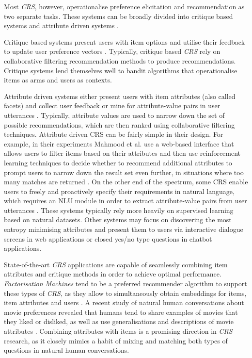 Most \textit{CRS}, however, operationalise preference elicitation and recommendation as two separate tasks. These systems can be broadly divided into critique based systems and attribute driven systems \citep{jannach2021survey, pramod2022conversational}. 

Critique based systems present users with item options and utilise their feedback to update user preference vectors \citep{viappiani2009regret, christakopoulou2016towards, vendrov2020gradient}. Typically, critique based \textit{CRS} rely on collaborative filtering recommendation methods to produce recommendations. Critique systems lend themselves well to bandit algorithms that operationalise items as arms and users as contexts.

Attribute driven systems either present users with item attributes (also called facets) and collect user feedback or mine for attribute-value pairs in user utterances \citep{mahmood2009improving, sun2018conversational, tsumita2019dialogue, kang2019recommendation}. Typically, attribute values are used to narrow down the set of possible recommendations, which are then ranked using collaborative filtering techniques. Attribute driven CRS can be fairly simple in their design. For example, in their experiments Mahmood et al. use a web-based interface that allows users to filter items based on their attributes and then use reinforcement learning techniques to decide whether to recommend additional attributes to prompt users to narrow down the result set even further, in situations where too many matches are returned \citep{mahmood2009improving, mahmood2008adaptive, mahmood2007learning, mahmood2008adapting}. On the other end of the spectrum, some CRS enable users to freely and proactively specify their requirements in natural language, which requires an NLU module in order to extract attribute-value pairs from user utterances \citep{kang2019recommendation, sun2018conversational, tsumita2019dialogue}. These systems typically rely more heavily on supervised learning based on natural datasets. Other systems may focus on discovering the most entropy minimising attributes and present them to users via interactive dialogue screens in web applications or closed yes/no type questions in chatbot applications.

State-of-the-art \textit{CRS} applications are capable of seamlessly combining item attributes and critique methods in order to achieve optimal performance. \textit{Factorisation Machines} tend to be a preferred recommender algorithm to support these types of \textit{CRS}, as they allow to simultaneously obtain embeddings for items, item attributes and users \citep{li2021seamlessly}. A recent study of natural human conversations about movie preferences revealed that humans tend to share examples of movies that they liked or disliked, as well as use generalisations and descriptions of movie attributes \citep{radlinski2019coached}. Combining attributes with items is a promising direction in \textit{CRS} research, as it closely mimics a habit of mixing and matching both types of questions in natural human conversations. 

